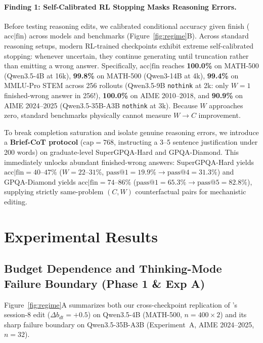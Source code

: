 \documentclass[10pt]{article}
\begin{document}
\paragraph{Finding 1: Self-Calibrated RL Stopping Masks Reasoning Errors.}
Before testing reasoning edits, we calibrated conditional accuracy given finish ($\mathrm{acc}|\mathrm{fin}$) across models and benchmarks (Figure~\ref{fig:regime}B). Across standard reasoning setups, modern RL-trained checkpoints exhibit extreme self-calibrated stopping: whenever uncertain, they continue generating until truncation rather than emitting a wrong answer. Specifically, $\mathrm{acc}|\mathrm{fin}$ reaches \textbf{100.0\%} on MATH-500 (Qwen3.5-4B at 16k), \textbf{99.8\%} on MATH-500 (Qwen3-14B at 4k), \textbf{99.4\%} on MMLU-Pro STEM across 256 rollouts (Qwen3.5-9B \texttt{nothink} at 2k: only $W=1$ finished-wrong answer in 256!), \textbf{100.0\%} on AIME 2010--2018, and \textbf{90.9\%} on AIME 2024--2025 (Qwen3.5-35B-A3B \texttt{nothink} at 3k). Because $W$ approaches zero, standard benchmarks physically cannot measure $W\!\to\!C$ improvement.

To break completion saturation and isolate genuine reasoning errors, we introduce a \textbf{Brief-CoT protocol} ($\mathrm{cap}=768$, instructing a 3--5 sentence justification under 200 words) on graduate-level SuperGPQA-Hard and GPQA-Diamond. This immediately unlocks abundant finished-wrong answers: SuperGPQA-Hard yields $\mathrm{acc}|\mathrm{fin}=40\text{--}47\%$ ($W=22\text{--}31\%$, $\mathrm{pass@1}=19.9\% \to \mathrm{pass@4}=31.3\%$) and GPQA-Diamond yields $\mathrm{acc}|\mathrm{fin}=74\text{--}86\%$ ($\mathrm{pass@1}=65.3\% \to \mathrm{pass@5}=82.8\%$), supplying strictly same-problem $(C, W)$ counterfactual pairs for mechanistic editing.

\section{Experimental Results}
\label{sec:results}

\subsection{Budget Dependence and Thinking-Mode Failure Boundary (Phase 1 \& Exp A)}
\label{sec:expa}

Figure~\ref{fig:regime}A summarizes both our cross-checkpoint replication of \citet{fan2026selfrewriting}'s session-8 edit ($\Delta b_{dt}=+0.5$) on Qwen3.5-4B (MATH-500, $n=400\times 2$) and its sharp failure boundary on Qwen3.5-35B-A3B (Experiment~A, AIME 2024--2025, $n=32$).
\end{document}
